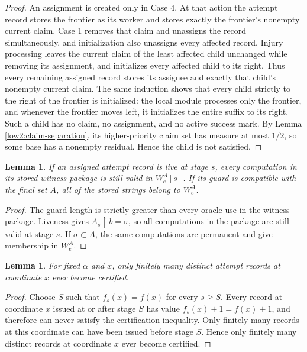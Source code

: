 \documentclass[10pt,a4paper]{amsart}
\newtheorem{lemma}[theorem]{Lemma}
\begin{document}
\begin{proof}
An assignment is created only in Case 4. At that action the attempt record
stores the frontier as its worker and stores exactly the frontier's nonempty
current claim. Case 1 removes that claim and unassigns the record
simultaneously, and initialization also unassigns every affected record.
Injury processing leaves the current claim of the least affected child
unchanged while removing its assignment, and initializes every affected child
to its right. Thus every remaining assigned record stores its assignee and
exactly that child's nonempty current claim. The same induction shows that every child
strictly to the right of the frontier is initialized: the local module
processes only the frontier, and whenever the frontier moves left, it
initializes the entire suffix to its right. Such a child has no claim, no
assignment, and no active success mark. By Lemma
\ref{low2:claim-separation}, its higher-priority claim set has measure at most
$1/2$, so some base has a nonempty residual. Hence the child is not satisfied.
\end{proof}

\begin{lemma}\label{low2:certification-safety}
If an assigned attempt record is live at stage $s$, every computation in its
stored witness package is still valid in $W_e^A[s]$. If its guard is
compatible with the final set $A$, all of the stored strings belong to
$W_e^A$.
\end{lemma}

\begin{proof}
The guard length is strictly greater than every oracle use in the witness
package. Liveness gives $A_s\upharpoonright b=\sigma$, so all computations in
the package are still valid at stage $s$. If $\sigma\subset A$, the same
computations are permanent and give membership in $W_e^A$.
\end{proof}

\begin{lemma}\label{low2:finite-certification}
For fixed $\alpha$ and $x$, only finitely many distinct attempt records at
coordinate $x$ ever become certified.
\end{lemma}

\begin{proof}
Choose $S$ such that $f_s(x)=f(x)$ for every $s\geq S$. Every record at
coordinate $x$ issued at or after stage $S$ has value
$f_s(x)+1=f(x)+1$, and therefore can never satisfy the certification
inequality. Only finitely many records at this
coordinate can have been issued before stage $S$. Hence only finitely many
distinct records at coordinate $x$ ever become certified.
\end{proof}
\end{document}
